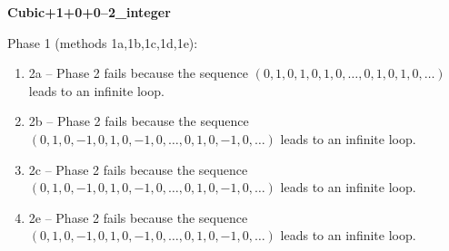 \begin{exmp}
\label{ex:compareAS}

\textbf{Cubic+1+0+0--2\_integer}

Phase 1 (methods 1a,\allowbreak  1b,\allowbreak  1c,\allowbreak  1d,\allowbreak  1e):
\begin{enumerate}[ ]
\item  2a -- Phase 2   fails because  the sequence $(0,\allowbreak  1,\allowbreak  0,\allowbreak  1,\allowbreak  0,\allowbreak  1,\allowbreak  0,\allowbreak  \dots ,\allowbreak 0,\allowbreak  1,\allowbreak  0,\allowbreak  1,\allowbreak  0,\allowbreak  \dots)$ leads to an infinite loop.
\item  2b -- Phase 2   fails because  the sequence $(0,\allowbreak  1,\allowbreak  0,\allowbreak  -1,\allowbreak  0,\allowbreak  1,\allowbreak  0,\allowbreak  -1,\allowbreak  0,\allowbreak  \dots ,\allowbreak 0,\allowbreak  1,\allowbreak  0,\allowbreak  -1,\allowbreak  0,\allowbreak  \dots)$ leads to an infinite loop.
\item  2c -- Phase 2   fails because  the sequence $(0,\allowbreak  1,\allowbreak  0,\allowbreak  -1,\allowbreak  0,\allowbreak  1,\allowbreak  0,\allowbreak  -1,\allowbreak  0,\allowbreak  \dots ,\allowbreak 0,\allowbreak  1,\allowbreak  0,\allowbreak  -1,\allowbreak  0,\allowbreak  \dots)$ leads to an infinite loop.
\item  2e -- Phase 2   fails because  the sequence $(0,\allowbreak  1,\allowbreak  0,\allowbreak  -1,\allowbreak  0,\allowbreak  1,\allowbreak  0,\allowbreak  -1,\allowbreak  0,\allowbreak  \dots ,\allowbreak 0,\allowbreak  1,\allowbreak  0,\allowbreak  -1,\allowbreak  0,\allowbreak  \dots)$ leads to an infinite loop.
\end{enumerate}


\end{exmp}




